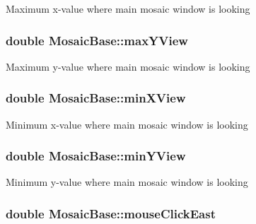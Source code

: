 \label{class_mosaic_base_ab0d0a72f9f9028e90d92b059f60b7a5e}
Maximum x-\/value where main mosaic window is looking \hypertarget{class_mosaic_base_a55f96772dbfa0f25143a2927bbb12688}{
\subsubsection[{maxYView}]{\setlength{\rightskip}{0pt plus 5cm}double {\bf MosaicBase::maxYView}}}
\label{class_mosaic_base_a55f96772dbfa0f25143a2927bbb12688}
Maximum y-\/value where main mosaic window is looking \hypertarget{class_mosaic_base_a7fa3598e3deadf8a5f501ef8d7469d1c}{
\subsubsection[{minXView}]{\setlength{\rightskip}{0pt plus 5cm}double {\bf MosaicBase::minXView}}}
\label{class_mosaic_base_a7fa3598e3deadf8a5f501ef8d7469d1c}
Minimum x-\/value where main mosaic window is looking \hypertarget{class_mosaic_base_abb0507d536e6e7c01ef631a2aa31bd66}{
\subsubsection[{minYView}]{\setlength{\rightskip}{0pt plus 5cm}double {\bf MosaicBase::minYView}}}
\label{class_mosaic_base_abb0507d536e6e7c01ef631a2aa31bd66}
Minimum y-\/value where main mosaic window is looking \hypertarget{class_mosaic_base_a3912a0636e2b6f62a841deddb077fc4e}{
\subsubsection[{mouseClickEast}]{\setlength{\rightskip}{0pt plus 5cm}double {\bf MosaicBase::mouseClickEast}}}
